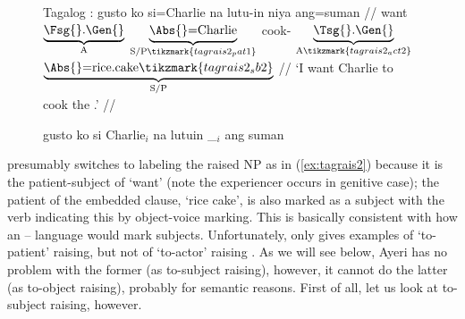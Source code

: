 \begin{figure}[h]
\pex\label{ex:tagrais2}
Tagalog \parencite[adpated from][28]{kroeger1991}:
\a\label{ex:tagrais2_1}\begingl[aboveglbskip=1.5em, aboveglftskip=1.75em]
	\gla gusto ko si=Charlie na lutu-in niya ang=suman //
	\glb want
		$\underbrace{\text{\Fsg{}.\Gen{}}}_{\text{A}}$
		$\underbrace{\text{\Abs{}=Charlie}}_{\text{S/P}%
			\tikzmark{tagrais2_pat1}%
		}$
		\Comp{}
		cook-\Ov{}%
		$\underbrace{\text{\smash{\Tsg{}}.\Gen{}}}_{\text{A}%
			\tikzmark{tagrais2_act2}%
		}$
		$\underbrace{\text{\Abs{}=rice.cake}%
			\tikzmark{tagrais2_sb2}%
		}_{\text{S/P}}$
		//
	\glft `I want Charlie to cook the .' //
\endgl
{}

\a\label{ex:tagrais2_2}%
	\ljudge* gusto ko si Charlie$_i$ na lutuin \_$_i$ ang suman
\xe
\end{figure}

\citet{kroeger1991} presumably switches to labeling the raised NP as \Abs{} in
(\ref{ex:tagrais2}) because it is the patient-subject of  `want'
(note the experiencer  occurs in genitive case); the patient of the
embedded clause,  `rice cake', is also marked as a subject with the
verb indicating this by object-voice marking. This is basically consistent with
how an \Erg{}--\Abs{} language would mark subjects. Unfortunately,
\citet{kroeger1991} only gives examples of `to-patient' raising, but not of
`to-actor' raising \citep[430]{carnie2013}. As we will see below, Ayeri has no
problem with the former (as to-subject raising), however, it cannot do the
latter (as to-object raising), probably for semantic reasons. First of all, let
us look at to-subject raising, however.

